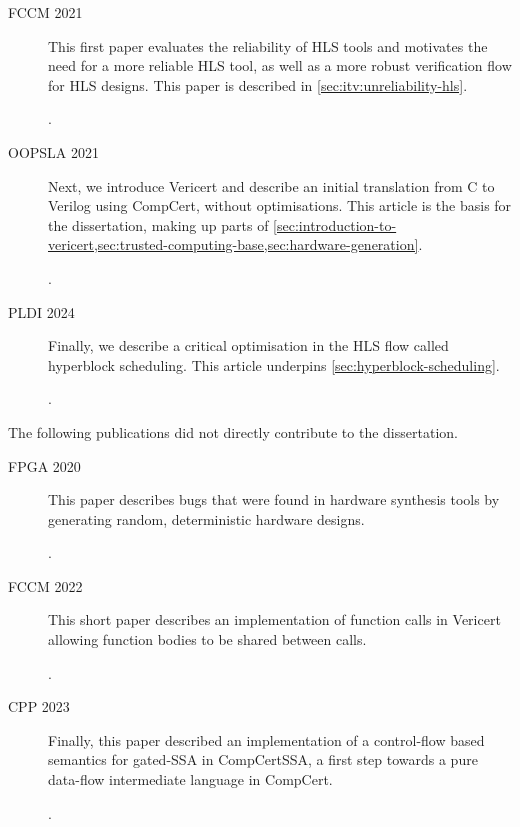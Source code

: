 \begin{description}

\item[FCCM 2021] This first paper evaluates the reliability of \gls{HLS} tools
  and motivates the need for a more reliable \gls{HLS} tool, as well as a more
  robust verification flow for \gls{HLS} designs.  This paper is described in
  \cref{sec:itv:unreliability-hls}.

  .

\item[OOPSLA 2021] Next, we introduce Vericert and describe an initial
  translation from C to Verilog using \gls{CompCert}, without optimisations.
  This article is the basis for the dissertation, making up parts of
  \cref{sec:introduction-to-vericert,sec:trusted-computing-base,sec:hardware-generation}.

  .

\item[PLDI 2024] Finally, we describe a critical optimisation in the \gls{HLS}
  flow called \gls{hyperblock scheduling}.  This article underpins
  \cref{sec:hyperblock-scheduling}.

  .

\end{description}

The following publications did not directly contribute to the dissertation.

\begin{description}
\item[FPGA 2020] This paper describes bugs that were found in hardware synthesis
  tools by generating random, deterministic hardware designs.

  .
\item[FCCM 2022] This short paper describes an implementation of function calls
  in Vericert allowing function bodies to be shared between calls.

  .
\item[CPP 2023] Finally, this paper described an implementation of a
  control-flow based semantics for gated-SSA in CompCertSSA, a first step
  towards a pure data-flow intermediate language in CompCert.

  .
\end{description}

